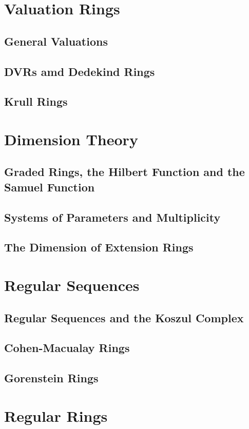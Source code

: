 \section{Valuation Rings}
\subsection{General Valuations}
\subsection{DVRs amd Dedekind Rings}
\subsection{Krull Rings}

\section{Dimension Theory}
\subsection{Graded Rings, the Hilbert Function and the Samuel Function}
\subsection{Systems of Parameters and Multiplicity}
\subsection{The Dimension of Extension Rings}

\section{Regular Sequences}
\subsection{Regular Sequences and the Koszul Complex}
\subsection{Cohen-Macualay Rings}
\subsection{Gorenstein Rings}

\section{Regular Rings}

